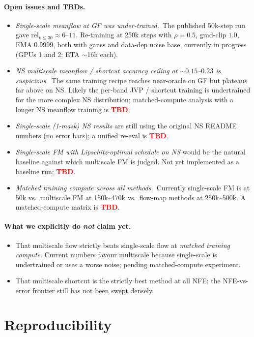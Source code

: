 \documentclass[11pt]{article}
\newcommand{\TBD}{\textcolor{red}{\textbf{TBD}}}
\newcommand{\meanrel}{\overline{\text{rel}}}
\begin{document}
\paragraph{Open issues and TBDs.}
\begin{itemize}
\item \emph{Single-scale meanflow at GF was under-trained.}\ The published 50k-step run gave $\meanrel_{k\leq 30} \approx 6$--$11$. Re-training at 250k steps with $\rho=0.5$, grad-clip $1.0$, EMA $0.9999$, both with gauss and data-dep noise base, currently in progress (GPUs 1 and 2; ETA $\sim$16h each).
\item \emph{NS multiscale meanflow / shortcut accuracy ceiling at $\sim 0.15$--$0.23$ is suspicious.}\ The same training recipe reaches near-oracle on GF but plateaus far above on NS. Likely the per-band JVP / shortcut training is undertrained for the more complex NS distribution; matched-compute analysis with a longer NS meanflow training is \TBD.
\item \emph{Single-scale (1-mask) NS results} are still using the original NS README numbers (no error bars); a unified re-eval is \TBD.
\item \emph{Single-scale FM with Lipschitz-optimal schedule on NS} would be the natural baseline against which multiscale FM is judged. Not yet implemented as a baseline run; \TBD.
\item \emph{Matched training compute across all methods.}\ Currently single-scale FM is at 50k vs.\ multiscale FM at 150k--470k vs.\ flow-map methods at 250k--500k. A matched-compute matrix is \TBD.
\end{itemize}

\paragraph{What we explicitly do \emph{not} claim yet.}
\begin{itemize}
\item That multiscale flow strictly beats single-scale flow at \emph{matched training compute}. Current numbers favour multiscale because single-scale is undertrained or uses a worse noise; pending matched-compute experiment.
\item That multiscale shortcut is the strictly best method at all NFE; the NFE-vs-error frontier still has not been swept densely.
\end{itemize}

\section{Reproducibility}
\label{sec:reproducibility}
\end{document}
